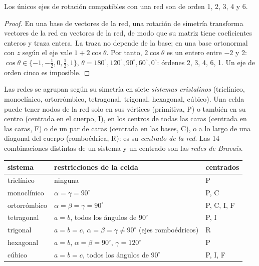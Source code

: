 \begin{theorem}\label{thm:b3:x-ray-diffraction:restriction}
Los únicos ejes de rotación compatibles con una red son de orden 1, 2, 3, 4 y 6.
\end{theorem}

\begin{proof}
En una base de vectores de la red, una rotación de simetría transforma vectores de la red en
vectores de la red, de modo que su matriz tiene coeficientes enteros y traza entera. La
traza no depende de la base; en una base ortonormal con $z$ según el
eje vale $1 + 2\cos\theta$. Por tanto, $2\cos\theta$ es un entero entre $-2$ y 2:
$\cos\theta \in \{-1, -\frac12, 0, \frac12, 1\}$, $\theta = 180^\circ, 120^\circ, 90^\circ,
60^\circ, 0^\circ$: órdenes 2, 3, 4, 6, 1. Un eje de orden cinco es imposible.
\end{proof}

\begin{definition}\label{def:b3:x-ray-diffraction:crystal-system}
Las redes se agrupan según su simetría en siete \emph{sistemas
cristalinos} (triclínico, monoclínico, ortorrómbico, tetragonal,
trigonal, hexagonal, cúbico). Una celda puede tener nodos de la red solo en sus vértices
(primitiva, P) o también en su centro (centrada en el cuerpo, I), en los centros de todas las
caras (centrada en las caras, F) o de un par de caras (centrada en las bases, C), o a lo largo de una
diagonal del cuerpo (romboédrica, R): es su \emph{centrado de la
red}. Las 14 combinaciones distintas de un sistema y
un centrado son las \emph{redes de Bravais}.
\end{definition}

\begin{center}\small
\begin{tabular}{lll}
\hline
sistema & restricciones de la celda & centrados \\ \hline
triclínico & ninguna & P \\
monoclínico & $\alpha = \gamma = 90^\circ$ & P, C \\
ortorrómbico & $\alpha = \beta = \gamma = 90^\circ$ & P, C, I, F \\
tetragonal & $a = b$, todos los ángulos de $90^\circ$ & P, I \\
trigonal & $a = b = c$, $\alpha = \beta = \gamma \ne 90^\circ$ (ejes romboédricos) & R \\
hexagonal & $a = b$, $\alpha = \beta = 90^\circ$, $\gamma = 120^\circ$ & P \\
cúbico & $a = b = c$, todos los ángulos de $90^\circ$ & P, I, F \\ \hline
\end{tabular}
\end{center}

